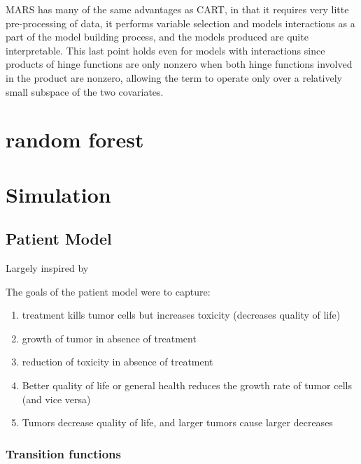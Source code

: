 \documentclass[12pt]{article}
\begin{document}
MARS has many of the same advantages as CART, in that it requires very litte pre-processing of data, it performs variable selection and models interactions as a part of the model building process, and the models produced are quite interpretable. This last point holds even for models with interactions since products of hinge functions are only nonzero when both hinge functions involved in the product are nonzero, allowing the term to operate only over a relatively small subspace of the two covariates. 







\section{random forest} %
\label{sec:random_forest}


\section{Simulation}

\subsection{Patient Model} %
\label{sub:vpm}

Largely inspired by \cite{paper}

The goals of the patient model were to capture:

\begin{enumerate}
  \item treatment kills tumor cells but increases toxicity (decreases quality of life)
  \item growth of tumor in absence of treatment
  \item reduction of toxicity in absence of treatment
  \item Better quality of life or general health reduces the growth rate of tumor cells (and vice versa)
  \item Tumors decrease quality of life, and larger tumors cause larger decreases
\end{enumerate} 

\subsubsection{Transition functions} %
\label{ssub:transition_functions}
\end{document}
